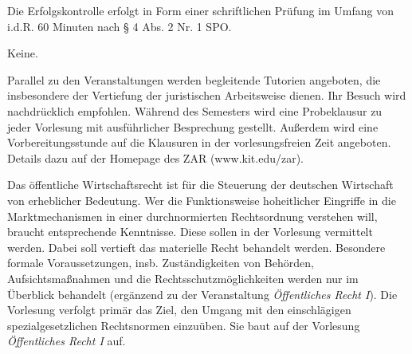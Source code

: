 \begin{course}

\setdoclanguagegerman
{}



\coursehead


\label{cour_4395.dp_997}


\begin{styleenv}
\begin{assessment}
Die Erfolgskontrolle erfolgt in Form einer schriftlichen Prüfung im Umfang von i.d.R. 60 Minuten nach § 4 Abs. 2 Nr. 1 SPO.


\end{assessment}

\begin{conditions}Keine.\end{conditions}

\begin{recommendations}Parallel zu den Veranstaltungen werden begleitende Tutorien angeboten, die insbesondere der Vertiefung der juristischen Arbeitsweise dienen. Ihr Besuch wird nachdrücklich empfohlen.\newline
Während des Semesters wird eine Probeklausur zu jeder Vorlesung mit ausführlicher Besprechung gestellt. Außerdem wird eine Vorbereitungsstunde auf die Klausuren in der vorlesungsfreien Zeit angeboten.\newline
Details dazu auf der Homepage des ZAR (www.kit.edu/zar).

\end{recommendations}
\end{styleenv}

\begin{learningoutcomes}
Das öffentliche Wirtschaftsrecht ist für die Steuerung der deutschen Wirtschaft von erheblicher Bedeutung. Wer die Funktionsweise hoheitlicher Eingriffe in die Marktmechanismen in einer durchnormierten Rechtsordnung verstehen will, braucht entsprechende Kenntnisse. Diese sollen in der Vorlesung vermittelt werden. Dabei soll vertieft das materielle Recht behandelt werden. Besondere formale Voraussetzungen, insb. Zuständigkeiten von Behörden, Aufsichtsmaßnahmen und die Rechtsschutzmöglichkeiten werden nur im Überblick behandelt (ergänzend zu der Veranstaltung \emph{Öffentliches Recht I}). Die Vorlesung verfolgt primär das Ziel, den Umgang mit den einschlägigen spezialgesetzlichen Rechtsnormen einzuüben. Sie baut auf der Vorlesung \emph{Öffentliches Recht I} auf.



\end{learningoutcomes}
\end{course}

